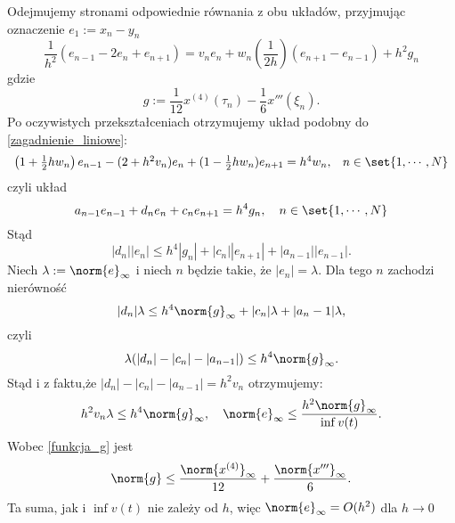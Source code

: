Odejmujemy stronami odpowiednie równania z obu układów, przyjmując oznaczenie $e_1:=x_n - y_n$
\begin{equation}
\frac{1}{h^2}(e_{n-1} - 2e_n + e_{n+1}) = v_ne_n + w_n(\frac{1}{2h})(e_{n+1} - e_{n-1})+ h^2g_n
\end{equation}
gdzie 
\begin{equation}\label{funkcja_g}
g:= \frac{1}{12} x^{(4)}(\tau_n) - \frac{1}{6} x'''(\xi_n).
\end{equation}
Po oczywistych przekształceniach otrzymujemy układ podobny do \eqref{zagadnienie_liniowe}:
$$
\begin{array}{cl}
\left(1+ \frac{1}{2}hw_n\right)e_{n-1} - (2+ h^2v_n)e_n + (1- \frac{1}{2}hw_n)e_{n+1} = h^4w_n ,& n \in \set{1,\cdots,N}
\end{array}
$$
czyli układ
$$
a_{n-1}e_{n-1} + d_ne_n + c_ne_{n+1} = h^4g_n, \quad n \in \set{1,\cdots,N}
$$
Stąd 
$$
|d_n||e_n| \leq h^4|g_n| + |c_n||e_{n+1}| + |a_{n-1}||e_{n-1}|.
$$
Niech $\lambda := {\norm{e}}_\infty$ i niech $n$ będzie takie, że $|e_n| = \lambda$. Dla tego $n$ zachodzi nierówność
$$
|d_n|\lambda \leq h^4 {\norm{g}}_\infty + |c_n|\lambda + |a_n -1|\lambda,
$$
czyli 
$$
\lambda(|d_n|-|c_n|-|a_{n-1}|) \leq h^4 {\norm{g}}_\infty.
$$
Stąd i z faktu,że $|d_n|-|c_n|-|a_{n-1}| = h^2v_n$ otrzymujemy:
$$
h^2 v_n \lambda \leq h^4  {\norm{g}}_\infty, \quad {\norm{e}}_\infty \leq \frac{h^2 {\norm{g}}_\infty}{\inf v(t)}.
$$
Wobec \eqref{funkcja_g} jest
$$
\norm{g} \leq \frac{{\norm{x^{(4)}}}_\infty}{12}+\frac{{\norm{x'''}}_\infty}{6}.
$$
Ta suma, jak i $\inf v(t)$ nie zależy od $h$, więc ${\norm{e}}_\infty = O(h^2)$ dla $h \to 0$ 